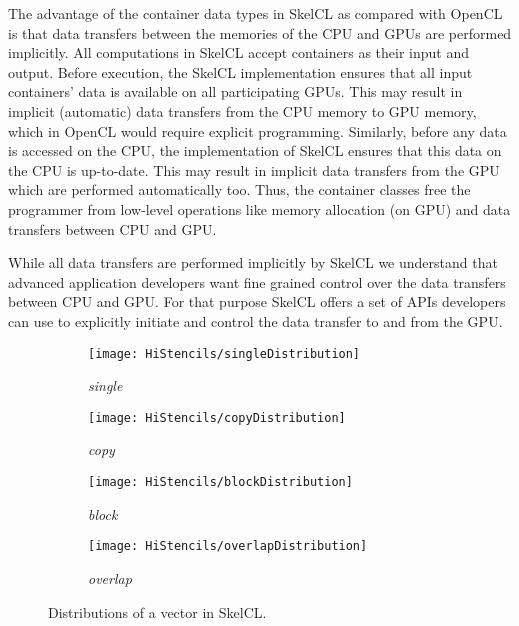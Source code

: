 The advantage of the container data types in SkelCL as compared with OpenCL is that data transfers between the memories of the CPU and GPUs are performed implicitly.
All computations in SkelCL accept containers as their input and output.
Before execution, the SkelCL implementation ensures that all input containers' data is available on all participating GPUs.
This may result in implicit (automatic) data transfers from the CPU memory to GPU memory, which in OpenCL would require explicit programming.
Similarly, before any data is accessed on the CPU, the implementation of SkelCL ensures that this data on the CPU is up-to-date.
This may result in implicit data transfers from the GPU which are performed automatically too.
Thus, the container classes free the programmer from low-level operations like memory allocation (on GPU) and data transfers between CPU and GPU.

While all data transfers are performed implicitly by SkelCL we understand that advanced application developers want fine grained control over the data transfers between CPU and GPU.
For that purpose SkelCL offers a set of APIs developers can use to explicitly initiate and control the data transfer to and from the GPU.

\begin{figure}[tb]
  \centering
  \begin{subfigure}{.22\textwidth}
    \texttt{[image: HiStencils/singleDistribution]}
    \caption{\emph{single}}
    \label{fig:distributions:single}
  \end{subfigure}
  \hfill
  \begin{subfigure}{.22\textwidth}
    \texttt{[image: HiStencils/copyDistribution]}
    \caption{\emph{copy}}
    \label{fig:distributions:copy}
  \end{subfigure}
  \hfill
  \begin{subfigure}{.22\textwidth}
    \texttt{[image: HiStencils/blockDistribution]}
    \caption{\emph{block}}
    \label{fig:distributions:block}
  \end{subfigure}
  \hfill
  \begin{subfigure}{.22\textwidth}
    \texttt{[image: HiStencils/overlapDistribution]}
    \caption{\emph{overlap}}
    \label{fig:distributions:overlap}
  \end{subfigure}
  \caption{Distributions of a vector in SkelCL.}
  \label{fig:distributions}
  \bigskip
\end{figure}

